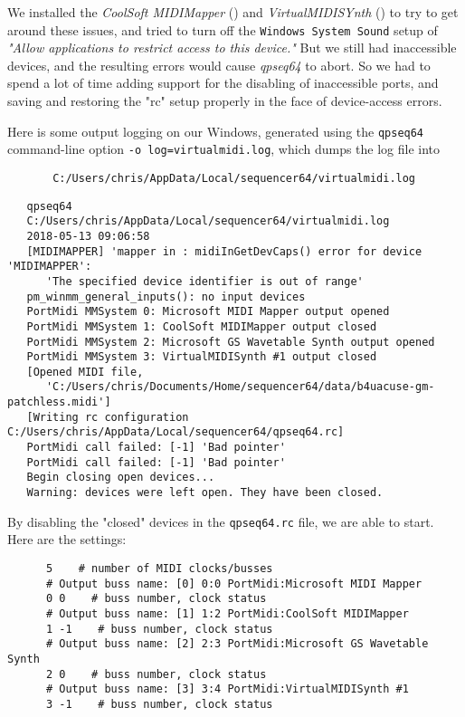     We installed the
    \textsl{CoolSoft MIDIMapper} (\cite{midimapper}) and
    \textsl{VirtualMIDISYnth} (\cite{midisynth}) to try to get
    around these issues, and tried to turn off the
    \texttt{Windows System Sound} setup of
    \textsl{"Allow applications to restrict access to this device."}
    But we still had
    inaccessible devices, and the resulting errors would cause
    \textsl{qpseq64} to
    abort.  So we had to spend a lot of time adding support for
    the disabling of
    inaccessible ports, and saving and restoring the "rc" setup properly
    in the face of device-access errors.

    Here is some output logging on our Windows, generated using the
    \texttt{qpseq64} command-line option
    \texttt{-o log=virtualmidi.log}, which dumps the log file into

   \begin{verbatim}
       C:/Users/chris/AppData/Local/sequencer64/virtualmidi.log
   \end{verbatim}

\begin{verbatim}
   qpseq64 
   C:/Users/chris/AppData/Local/sequencer64/virtualmidi.log 
   2018-05-13 09:06:58 
   [MIDIMAPPER] 'mapper in : midiInGetDevCaps() error for device 'MIDIMAPPER':
      'The specified device identifier is out of range'
   pm_winmm_general_inputs(): no input devices
   PortMidi MMSystem 0: Microsoft MIDI Mapper output opened
   PortMidi MMSystem 1: CoolSoft MIDIMapper output closed
   PortMidi MMSystem 2: Microsoft GS Wavetable Synth output opened
   PortMidi MMSystem 3: VirtualMIDISynth #1 output closed
   [Opened MIDI file,
      'C:/Users/chris/Documents/Home/sequencer64/data/b4uacuse-gm-patchless.midi']
   [Writing rc configuration C:/Users/chris/AppData/Local/sequencer64/qpseq64.rc]
   PortMidi call failed: [-1] 'Bad pointer'
   PortMidi call failed: [-1] 'Bad pointer'
   Begin closing open devices...
   Warning: devices were left open. They have been closed.
\end{verbatim}

    By disabling the "closed" devices in the \texttt{qpseq64.rc} file,
    we are able to start.  Here are the settings:

\begin{verbatim}
      5    # number of MIDI clocks/busses
      # Output buss name: [0] 0:0 PortMidi:Microsoft MIDI Mapper
      0 0    # buss number, clock status
      # Output buss name: [1] 1:2 PortMidi:CoolSoft MIDIMapper
      1 -1    # buss number, clock status
      # Output buss name: [2] 2:3 PortMidi:Microsoft GS Wavetable Synth
      2 0    # buss number, clock status
      # Output buss name: [3] 3:4 PortMidi:VirtualMIDISynth #1
      3 -1    # buss number, clock status
\end{verbatim}

